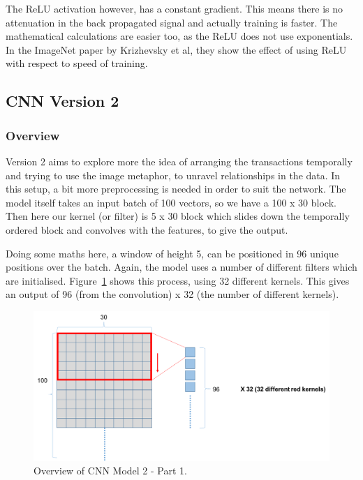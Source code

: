 \documentclass[12pt,a4paper,twoside]{report}
\begin{document}
The ReLU activation however, has a constant gradient. This means there is no attenuation in the back propagated signal and actually training is faster. The mathematical calculations are easier too, as the ReLU does not use exponentials. In the ImageNet\cite{krizhevsky2012imagenet} paper by Krizhevsky et al, they show the effect of using ReLU with respect to speed of training. 

\subsection{CNN Version 2}

\subsubsection{Overview}

Version 2 aims to explore more the idea of arranging the transactions temporally and trying to use the image metaphor, to unravel relationships in the data. In this setup, a bit more preprocessing is needed in order to suit the network. The model itself takes an input batch of 100 vectors, so we have a 100 x 30 block. Then here our kernel (or filter) is 5 x 30 block which slides down the temporally ordered block and convolves with the features, to give the output. 

Doing some maths here, a window of height 5, can be positioned in 96 unique positions over the batch. Again, the model uses a number of different filters which are initialised. Figure~\ref{fig:cnnv2-1} shows this process, using 32 different kernels. This gives an output of 96 (from the convolution) x 32 (the number of different kernels).

\begin{figure}[H]
\centering
\includegraphics[scale=0.5]{cnnv2-1}
\caption{Overview of CNN Model 2 - Part 1.}
\label{fig:cnnv2-1}
\end{figure}
\end{document}
